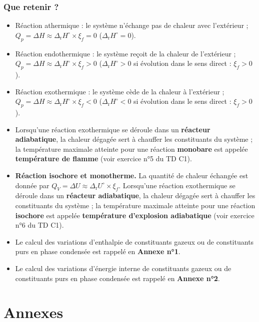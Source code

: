 \documentclass{article}
\newcommand{\Dr}{\Delta_{\mathrm{r}}}
\begin{document}
\subsubsection{Que retenir ?}
\begin{important}
    \begin{itemize}[leftmargin=5pt]
        \item Réaction athermique : le système n'échange pas de chaleur avec l’extérieur ; $Q_p = \Delta H \approx \Dr H^\circ\times \xi_f = 0$ ($\Dr H^\circ = 0$).
        \item Réaction endothermique : le système reçoit de la chaleur de l’extérieur ; $Q_p = \Delta H \approx \Dr H^\circ\times \xi_f  > 0$ ($\Dr H^\circ > 0$ si évolution dans le sens direct : $\xi_f > 0$).
        \item Réaction exothermique : le système cède de la chaleur à l’extérieur ; $Q_p = \Delta H \approx \Dr H^\circ\times \xi_f  < 0$ ($\Dr H^\circ < 0$ si évolution dans le sens direct : $\xi_f > 0$).
    \end{itemize}
\end{important}
\begin{itemize}
    \item Lorsqu’une réaction exothermique se déroule dans un \textbf{réacteur adiabatique}, la chaleur dégagée sert à chauffer les constituants du système ; la température maximale atteinte pour une réaction \textbf{monobare} est appelée \textbf{température de flamme} (voir exercice n°5 du TD C1).
    \item \textbf{Réaction isochore et monotherme.} La quantité de chaleur échangée est donnée par $Q_V = \Delta U \approx \Dr U^\circ \times \xi_f$. Lorsqu’une réaction exothermique se déroule dans un \textbf{réacteur adiabatique}, la chaleur dégagée sert à chauffer les constituants du système ; la température maximale atteinte pour une réaction \textbf{isochore} est appelée \textbf{température d’explosion adiabatique} (voir exercice n°6 du TD C1).
    \item Le calcul des variations d’enthalpie de constituants gazeux ou de constituants purs en phase condensée est rappelé en \textbf{\textsf{Annexe n°1}}.
    \item Le calcul des variations d’énergie interne de constituants gazeux ou de constituants purs en phase condensée est rappelé en \textbf{\textsf{Annexe n°2}}.

\end{itemize}


\pagebreak
\section*{Annexes}
\end{document}

